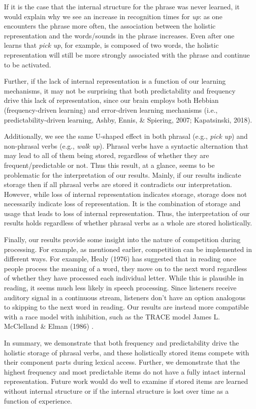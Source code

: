 \documentclass[
  man,floatsintext]{apa6}
\begin{document}
If it is the case that the internal structure for the phrase was never learned, it would explain why we see an increase in recognition times for \emph{up}: as one encounters the phrase more often, the association between the holistic representation and the words/sounds in the phrase increases. Even after one learns that \emph{pick up}, for example, is composed of two words, the holistic representation will still be more strongly associated with the phrase and continue to be activated.

Further, if the lack of internal representation is a function of our learning mechanisms, it may not be surprising that both predictability and frequency drive this lack of representation, since our brain employs both Hebbian (frequency-driven learning) and error-driven learning mechanisms (i.e., predictability-driven learning, Ashby, Ennis, \& Spiering, 2007; Kapatsinski, 2018).

Additionally, we see the same U-shaped effect in both phrasal (e.g., \emph{pick up}) and non-phrasal verbs (e.g., \emph{walk up}). Phrasal verbs have a syntactic alternation that may lead to all of them being stored, regardless of whether they are frequent/predictable or not. Thus this result, at a glance, seems to be problematic for the interpretation of our results. Mainly, if our results indicate storage then if all phrasal verbs are stored it contradicts our interpretation. However, while loss of internal representation indicates storage, storage does not necessarily indicate loss of representation. It is the combination of storage and usage that leads to loss of internal representation. Thus, the interpretation of our results holds regardless of whether phrasal verbs as a whole are stored holistically.

Finally, our results provide some insight into the nature of competition during processing. For example, as mentioned earlier, competition can be implemented in different ways. For example, Healy (1976) has suggested that in reading once people process the meaning of a word, they move on to the next word regardless of whether they have processed each individual letter. While this is plausible in reading, it seems much less likely in speech processing. Since listeners receive auditory signal in a continuous stream, listeners don't have an option analogous to skipping to the next word in reading. Our results are instead more compatible with a race model with inhibition, such as the TRACE model James L. McClelland \& Elman (1986) .

In summary, we demonstrate that both frequency and predictability drive the holistic storage of phrasal verbs, and these holistically stored items compete with their component parts during lexical access. Further, we demonstrate that the highest frequency and most predictable items do not have a fully intact internal representation. Future work would do well to examine if stored items are learned without internal structure or if the internal structure is lost over time as a function of experience.
\end{document}
